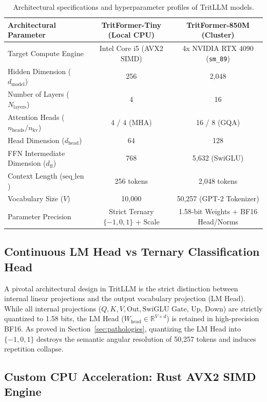 \documentclass[11pt,a4paper]{article}
\begin{document}
\begin{table}[h]
\centering
\small
\caption{Architectural specifications and hyperparameter profiles of TritLLM models.}
\vspace{0.4em}
\label{tab:models}
\begin{tabular}{lcc}
\toprule
\textbf{Architectural Parameter} & \textbf{TritFormer-Tiny (Local CPU)} & \textbf{TritFormer-850M (Cluster)} \\
\midrule
Target Compute Engine & Intel Core i5 (AVX2 SIMD) & 4x NVIDIA RTX 4090 (\texttt{sm\_89}) \\
Hidden Dimension ($d_{\text{model}}$) & 256 & 2,048 \\
Number of Layers ($N_{\text{layers}}$) & 4 & 16 \\
Attention Heads ($n_{\text{heads}} / n_{\text{kv}}$) & 4 / 4 (MHA) & 16 / 8 (GQA) \\
Head Dimension ($d_{\text{head}}$) & 64 & 128 \\
FFN Intermediate Dimension ($d_{\text{ff}}$) & 768 & 5,632 (SwiGLU) \\
Context Length ($\text{seq\_len}$) & 256 tokens & 2,048 tokens \\
Vocabulary Size ($V$) & 10,000 & 50,257 (GPT-2 Tokenizer) \\
Parameter Precision & Strict Ternary $\{-1, 0, 1\}$ + Scale & 1.58-bit Weights + BF16 Head/Norms \\
\bottomrule
\end{tabular}
\end{table}

\subsection{Continuous LM Head vs Ternary Classification Head}

A pivotal architectural design in TritLLM is the strict distinction between internal linear projections and the output vocabulary projection (LM Head). While all internal projections ($Q, K, V, \text{Out}, \text{SwiGLU Gate, Up, Down}$) are strictly quantized to 1.58 bits, the LM Head ($W_{\text{head}} \in \mathbb{R}^{V \times d}$) is retained in high-precision BF16. As proved in Section~\ref{sec:pathologies}, quantizing the LM Head into $\{-1, 0, 1\}$ destroys the semantic angular resolution of 50,257 tokens and induces repetition collapse.

\subsection{Custom CPU Acceleration: Rust AVX2 SIMD Engine}
\end{document}
